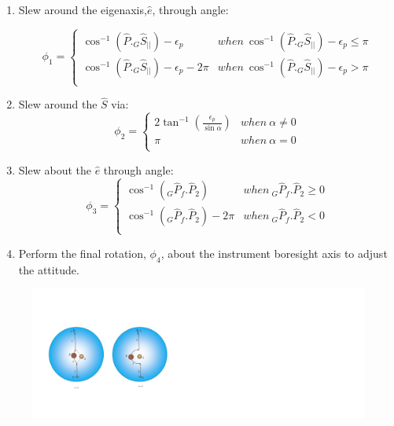 \documentclass[letterpaper, preprint, paper,11pt]{AAS}	%
\begin{document}
		\begin{enumerate}
			\item Slew around the eigenaxis,$\hat{e}$, through angle:
			
			\begin{equation}\label{phi1}
				\phi_1=\left\{
				\begin{array}{ll}
				\cos^{-1}(\hat{P}._G\hat{S}_{||})-\epsilon_p& when\  \cos^{-1}(\hat{P}._G\hat{S}_{||})-\epsilon_p\leq \pi\\
				\cos^{-1}(\hat{P}._G\hat{S}_{||})-\epsilon_p-2\pi& when\ \cos^{-1}(\hat{P}._G\hat{S}_{||})-\epsilon_p>\pi\\
				\end{array}
				\right.
			\end{equation}
			\item Slew around the $\hat{S}$ via:
			\begin{equation}\label{phi2}
				\phi_2=\left\{
				\begin{array}{ll}
				2\tan^{-1}(\frac{\epsilon_p}{\sin\alpha})& when\  \alpha\neq 0\\
				\pi& when\ \alpha=0\\
				\end{array}
				\right.
			\end{equation}
			\item Slew about the $\hat{e}$ through angle:
			\begin{equation}\label{phi3}
				\phi_3=\left\{
				\begin{array}{ll}
				\cos^{-1}(_G\hat{P}_f.\hat{P}_2)& when\  _G\hat{P}_f.\hat{P}_2\geq 0\\
				\cos^{-1}(_G\hat{P}_f.\hat{P}_2)-2\pi& when\ _G\hat{P}_f.\hat{P}_2<0\\
				\end{array}
				\right.
			\end{equation}
			
			\item Perform the final rotation, $\phi_4$, about the instrument boresight axis to adjust the attitude. 
		\end{enumerate}
	

		\begin{figure}[H]
			\begin{center}
			\includegraphics[width=6in]{./Figures/SASSchematic3}
			\end{center}
		\end{figure}
	
\end{document}
